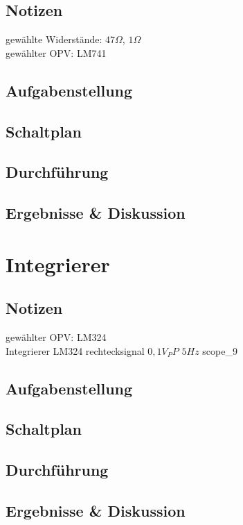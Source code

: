 \documentclass[12pt,a4paper,titlepage]{article}
\begin{document}
\subsection*{Notizen}
gew\"ahlte Widerst\"ande: $47\Omega$, $1\Omega$ \\
gew\"ahlter OPV: LM741 \\

\subsection*{Aufgabenstellung}

\subsection*{Schaltplan}

\subsection*{Durchf\"uhrung}

\subsection*{Ergebnisse \& Diskussion}


\section{Integrierer}

\subsection*{Notizen}
gew\"ahlter OPV: LM324 \\
Integrierer LM324 rechtecksignal $0,1 V_PP$ $5Hz$ scope\_9

\subsection*{Aufgabenstellung}

\subsection*{Schaltplan}

\subsection*{Durchf\"uhrung}

\subsection*{Ergebnisse \& Diskussion}
\end{document}
